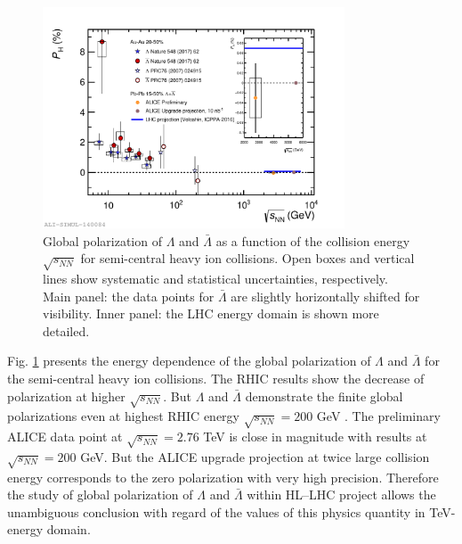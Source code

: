 \begin{figure}[!htb]
\begin{center}
\includegraphics[width=0.8\textwidth]{figs/alice_projection_lambda}
\caption{Global polarization of $\Lambda$ and $\bar{\Lambda}$ as a function of the collision energy $\sqrt{s_{NN}}$ for semi-central heavy ion collisions. Open boxes
and vertical lines show systematic and statistical uncertainties,
respectively. Main panel: the data points for $\bar{\Lambda}$ are slightly horizontally shifted for visibility. Inner panel: the LHC energy domain is shown more detailed.
}
\label{fig:alice_lambda}
\end{center}
\end{figure}

Fig. \ref{fig:alice_lambda} presents the energy dependence of the global polarization of $\Lambda$ and $\bar{\Lambda}$ for the semi-central heavy ion collisions. The RHIC results show the decrease of polarization at higher $\sqrt{s_{NN}}$. But $\Lambda$ and $\bar{\Lambda}$ demonstrate the finite global polarizations even at highest RHIC energy $\sqrt{s_{NN}}=200$ GeV \cite{PRC-98-014910-2018}. The preliminary ALICE data point at $\sqrt{s_{NN}}=2.76$ TeV is close in magnitude with results at $\sqrt{s_{NN}}=200$ GeV. But the ALICE upgrade projection at twice large collision energy corresponds to the zero polarization with very high precision. Therefore the study of global polarization of $\Lambda$ and $\bar{\Lambda}$ within HL--LHC project allows the unambiguous conclusion with regard of the values of this physics quantity in TeV-energy domain.    